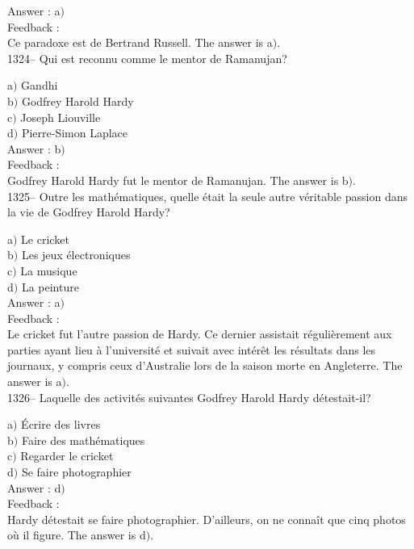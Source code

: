 \documentclass[letterpaper, 12pt]{article}
\begin{document}
Answer : a$)$\\

Feedback : \\
Ce paradoxe est de Bertrand Russell.
The answer is  a$)$.\\

1324-- Qui est reconnu comme le mentor de Ramanujan?

a$)$ Gandhi \\
b$)$ Godfrey Harold Hardy \\
c$)$ Joseph Liouville \\
d$)$ Pierre-Simon Laplace \\

Answer : b$)$\\

Feedback : \\
Godfrey Harold Hardy fut le mentor de Ramanujan.
The answer is  b$)$.\\

1325-- Outre les math\'ematiques, quelle \'etait la seule autre
v\'eritable passion dans la vie de Godfrey Harold Hardy?

a$)$ Le cricket \\
b$)$ Les jeux \'electroniques \\
c$)$ La musique \\
d$)$ La peinture \\

Answer : a$)$\\

Feedback : \\
Le cricket fut l'autre passion de Hardy. Ce dernier assistait
r\'eguli\`erement aux parties ayant lieu \`a l'universit\'e et
suivait avec int\'er\^et les r\'esultats dans les journaux, y
compris ceux d'Australie lors de la saison morte en Angleterre.
The answer is  a$)$.\\

1326-- Laquelle des activit\'es suivantes Godfrey Harold Hardy
d\'etestait-il?

a$)$ \'Ecrire des livres \\
b$)$ Faire des math\'ematiques \\
c$)$ Regarder le cricket \\
d$)$ Se faire photographier\\

Answer : d$)$\\

Feedback : \\
Hardy d\'etestait se faire photographier. D'ailleurs, on ne
conna\^it que cinq photos o\`u il figure.
The answer is  d$)$.\\
\end{document}
